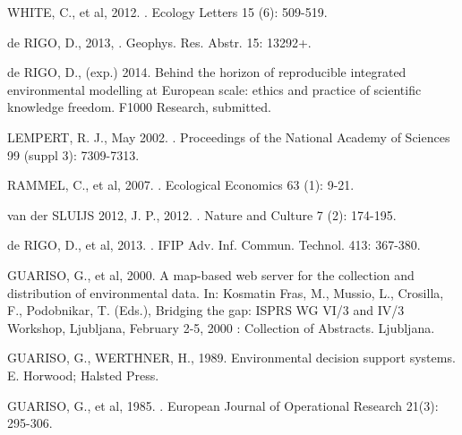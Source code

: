 \documentclass[12pt]{article}
\begin{document}
\begin{center}
{{\begin{spacing}{0.85}
\begin{nohyphens}
\begin{thebibliography}{43}
WHITE, C., et al, 2012. . Ecology Letters 15 (6): 509-519.


de RIGO, D., 2013, . Geophys. Res. Abstr. 15: 13292+.


de RIGO, D., (exp.) 2014. Behind the horizon of reproducible integrated environmental modelling at European scale: ethics and practice of scientific knowledge freedom. F1000 Research, submitted. 

LEMPERT, R. J., May 2002. . Proceedings of the National Academy of Sciences 99 (suppl 3): 7309-7313.


RAMMEL, C., et al, 2007. . Ecological Economics 63 (1): 9-21.


van der SLUIJS 2012, J. P., 2012. . Nature and Culture 7 (2): 174-195.


de RIGO, D., et al, 2013. . IFIP Adv. Inf. Commun. Technol. 413: 367-380.


GUARISO, G., et al, 2000. A map-based web server for the collection and distribution of environmental data. In: Kosmatin Fras, M., Mussio, L., Crosilla, F., Podobnikar, T. (Eds.), Bridging the gap: ISPRS WG VI/3 and IV/3 Workshop, Ljubljana, February 2-5, 2000 : Collection of Abstracts. Ljubljana. 

GUARISO, G., WERTHNER, H., 1989. Environmental decision support systems. E. Horwood; Halsted Press. 

GUARISO, G., et al, 1985. . European Journal of Operational Research 21(3): 295-306.



\end{thebibliography}
\end{nohyphens}
\end{spacing}}}
\end{center}
\end{document}
